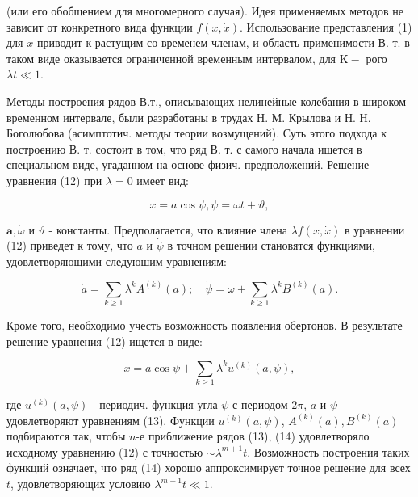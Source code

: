 \documentclass[10pt]{article}
\begin{document}
(или его обобщением для многомерного случая). Идея применяемых методов не зависит от конкретного вида функции $f(x, \dot{x})$. Использование представления (1) для $x$ приводит к растущим со временем членам, и область применимости В. т. в таком виде оказывается ограниченной временным интервалом, для $\mathrm{K}-$ рого $\lambda t \ll 1$.



Методы построения рядов В.т., описывающих нелинейные колебания в широком временном интервале, были разработаны в трудах Н. М. Крылова и Н. Н. Боголюбова (асимптотич. методы теории возмущений). Суть этого подхода к построению В. т. состоит в том, что ряд В. т. с самого начала ищется в специальном виде, угаданном на основе физич. предположений. Решение уравнения (12) при $\lambda=0$ имеет вид:



\[

x=a \cos \psi, \psi=\omega t+\vartheta,

\]



$\boldsymbol{a}, \dot{\omega}$ и $\vartheta$ - константы. Предполагается, что влияние члена $\lambda f(x, \dot{x})$ в уравнении (12) приведет к тому, что $\dot{a}$ и $\dot{\psi}$ в точном решении становятся функциями, удовлетворяющими следуюшим уравнениям:



\[

\dot{a}=\sum_{k \geqslant 1} \lambda^{k} A^{(k)}(a) ; \quad \dot{\psi}=\omega+\sum_{k \geqslant 1} \lambda^{k} B^{(k)}(a) .

\]



Кроме того, необходимо учесть возможность появления обертонов. В результате решение уравнения (12) ищется в виде:



\[

x=a \cos \psi+\sum_{k \geqslant 1} \lambda^{k} u^{(k)}(a, \psi),

\]



где $u^{(k)}(a, \psi)$ - периодич. функция угла $\psi$ с периодом $2 \pi$, $a$ и $\psi$ удовлетворяют уравнениям (13). Функции $u^{(k)}(a, \psi)$, $A^{(k)}(a), B^{(k)}(a)$ подбираются так, чтобы $n$-е приближение рядов (13), (14) удовлетворяло исходному уравнению (12) с точностью $\sim \lambda^{m+1} t$. Возможность построения таких функций означает, что ряд (14) хорошо аппроксимирует точное решение для всех $t$, удовлетворяющих условию $\lambda^{m+1} t \ll 1$.
\end{document}
